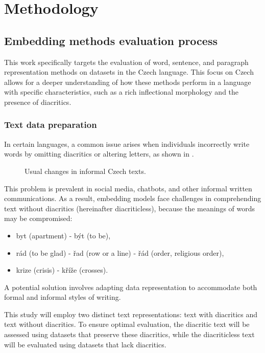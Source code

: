 
\chapter{Methodology\label{chap:methodology}}

\section{Embedding methods evaluation process}

This work specifically targets the evaluation of word, sentence, and paragraph representation methods on datasets in the Czech language.
This focus on Czech allows for a deeper understanding of how these methods perform in a language with specific characteristics, such as a rich inflectional morphology and the presence of diacritics.

\subsection{Text data preparation}
In certain languages, a common issue arises when individuals incorrectly write words by omitting diacritics or altering letters, as shown in .

\begin{figure}[h]
 \centering
  
 \caption{Usual changes in informal Czech texts.}
  \label{fig:diacritics_diacriticless}
\end{figure} 

This problem is prevalent in social media, chatbots, and other informal written communications.
As a result, embedding models face challenges in comprehending text without diacritics (hereinafter diacriticless), because the meanings of words may be compromised:
\begin{itemize}
  \item byt (apartment) - být (to be),
  \item rád (to be glad) - řad (row or a line) - řád (order, religious order),
  \item krize (crisis) - kříže (crosses).
\end{itemize}
A potential solution involves adapting data representation to accommodate both formal and informal styles of writing.

This study will employ two distinct text representations: text with diacritics and text without diacritics.
To ensure optimal evaluation, the diacritic text will be assessed using datasets that preserve these diacritics, while the diacriticless text will be evaluated using datasets that lack diacritics.

